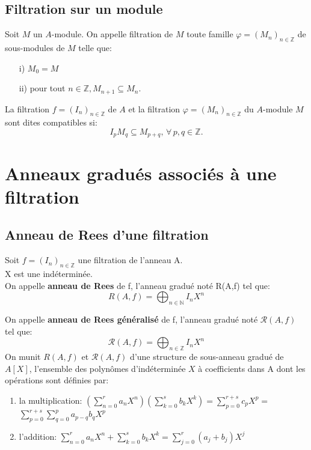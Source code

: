 \subsection{Filtration sur un module}
\begin{madefinition}
	Soit $M$ un $A$-module. On appelle filtration de $M$ toute famille $\varphi = (M_n)_{n \in \mathbb{Z}}$ de sous-modules de $M$ telle que:\\
	\begin{enumerate}
		\item[i)] $M_0 = M$ \\
		\item[ii)] pour tout $n \in \mathbb{Z}, M_{n+1} \subseteq M_n$.\\
	\end{enumerate}
	
	La filtration $f = (I_n)_{n \in \mathbb{Z}}$ de $A$ et la filtration $\varphi = (M_n)_{n \in \mathbb{Z}}$ du $A$-module $M$ sont dites compatibles si:
	\[ I_p M_q \subseteq M_{p+q} ,\, \forall \, p, q \in \mathbb{Z}. \]
\end{madefinition}
\section{Anneaux gradués associés à une filtration}
\subsection{Anneau de Rees d'une filtration}
\begin{madefinition}
	Soit $f=(I_n)_{n \in \mathbb{Z}}$ une filtration de l'anneau A.\\ X est une indéterminée.\\
	On appelle \textbf{anneau de Rees} de f, l'anneau gradué noté R(A,f) tel que: 
	\[ R(A,f)  =\displaystyle \bigoplus_{n \in \mathbb{N}}{I_n X^n}  \]
	
	On appelle \textbf{anneau de Rees généralisé} de f, l'anneau gradué noté $\mathcal{R}(A,f)$ tel que: 
	\[ \mathcal{R}(A,f) = \displaystyle \bigoplus_{n \in \mathbb{Z}}{I_n X^n}  \]
	On munit $R(A,f)$ et $\mathcal{R}(A,f)$ d'une structure de sous-anneau gradué de $A[X]$, l'ensemble des polynômes d'indéterminée $X$ à coefficients dans A dont les opérations sont définies par:
	
	\begin{enumerate}
		\item la multiplication:	$(\sum\limits_{n=0}^{r}a_{n}X^{n})(\sum\limits_{k=0}^{s}b_{k}X^{k})=\sum%
		\limits_{p=0}^{r+s}c_{p}X^{p}=$ $\sum\limits_{p=0}^{r+s}\sum%
		\limits_{q=0}^{p}a_{p-q}b_{q}X^{p}$
		\item l'addition:   $\sum\limits_{n=0}^{r}a_{n}X^{n}+\sum\limits_{k=0}^{s}b_{k}X^{k}=\sum%
		\limits_{j=0}^{r}(a_{j}+b_{j})X^{j}$
	\end{enumerate}
\end{madefinition}
